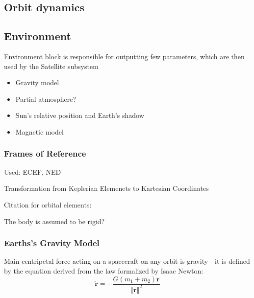 \subsection{Orbit dynamics}

\subsection{Environment}
    Environment block is responsible for outputting few parameters, which are then used by the Satellite subsystem
    \begin{itemize}
        \item Gravity model
        \item Partial atmosphere?
        \item Sun's relative position and Earth's shadow
        \item Magnetic model
    \end{itemize}

    \subsubsection{Frames of Reference}
        Used: ECEF, NED

        Transformation from Keplerian Elemenets to Kartesian Coordinates



    Citation for orbital elements: \cite{vallado2001fundamentals}

    The body is assumed to be rigid?

    \subsubsection{Earths's Gravity Model}

        Main centripetal force acting on a spacecraft on any orbit is gravity - it is defined by the equation derived from the law formalized by Isaac Newton:
        \begin{equation}
            \ddot{\textbf{r}} = -\frac{G(m_1+m_2)\textbf{r}}{\left\Vert \textbf{r} \right\Vert^2}
        \end{equation}

